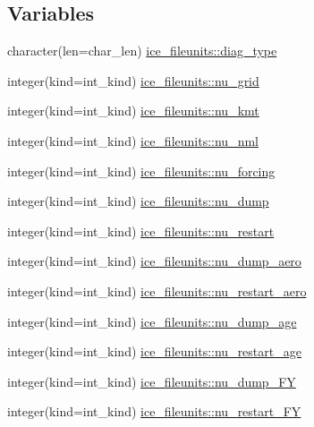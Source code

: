 \subsection*{Variables}
\begin{DoxyCompactItemize}
\item 
character(len=char\_\-len) \hyperlink{namespaceice__fileunits_af588ef6b480e0e304e6b78cfd39aa602}{ice\_\-fileunits::diag\_\-type}
\item 
integer(kind=int\_\-kind) \hyperlink{namespaceice__fileunits_a18ec8e581589b8dbeb70fbc61ae4a293}{ice\_\-fileunits::nu\_\-grid}
\item 
integer(kind=int\_\-kind) \hyperlink{namespaceice__fileunits_aaedfa4e4a189894dfedd14d7feabe219}{ice\_\-fileunits::nu\_\-kmt}
\item 
integer(kind=int\_\-kind) \hyperlink{namespaceice__fileunits_a1c0f914707e7a61a579be21df178f061}{ice\_\-fileunits::nu\_\-nml}
\item 
integer(kind=int\_\-kind) \hyperlink{namespaceice__fileunits_a946485641238cb0c4d99bb164de395eb}{ice\_\-fileunits::nu\_\-forcing}
\item 
integer(kind=int\_\-kind) \hyperlink{namespaceice__fileunits_a025a35472bb3adec583dbd13beddfa57}{ice\_\-fileunits::nu\_\-dump}
\item 
integer(kind=int\_\-kind) \hyperlink{namespaceice__fileunits_ae4a1de3342cf6bce1bd90d7517833d5d}{ice\_\-fileunits::nu\_\-restart}
\item 
integer(kind=int\_\-kind) \hyperlink{namespaceice__fileunits_a8232286371f4a1cf56670431049eec01}{ice\_\-fileunits::nu\_\-dump\_\-aero}
\item 
integer(kind=int\_\-kind) \hyperlink{namespaceice__fileunits_ada7b0914203fb0183cdf612624f0df75}{ice\_\-fileunits::nu\_\-restart\_\-aero}
\item 
integer(kind=int\_\-kind) \hyperlink{namespaceice__fileunits_aed4fd8df7055b78ad592b4395acb95a0}{ice\_\-fileunits::nu\_\-dump\_\-age}
\item 
integer(kind=int\_\-kind) \hyperlink{namespaceice__fileunits_a89e50699c9cae8e65d7fadbc1f065677}{ice\_\-fileunits::nu\_\-restart\_\-age}
\item 
integer(kind=int\_\-kind) \hyperlink{namespaceice__fileunits_aa4b048a7f0b7630f6ecfb8c0e183cbaa}{ice\_\-fileunits::nu\_\-dump\_\-FY}
\item 
integer(kind=int\_\-kind) \hyperlink{namespaceice__fileunits_af4ce2955d95671c93625715de173b82a}{ice\_\-fileunits::nu\_\-restart\_\-FY}
\item 

\end{DoxyCompactItemize}
